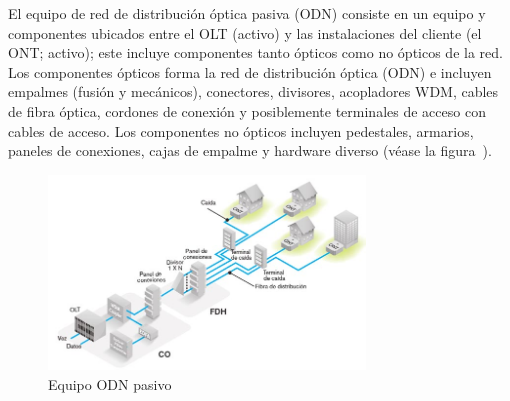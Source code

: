 El equipo de red de distribución óptica pasiva (ODN) consiste en un equipo y componentes ubicados entre el OLT (activo) y las instalaciones del cliente (el ONT; activo); este incluye componentes tanto ópticos como no ópticos de la red. Los componentes ópticos forma la red de distribución óptica (ODN) e incluyen empalmes (fusión y mecánicos), conectores, divisores, acopladores WDM, cables de fibra óptica, cordones de conexión y posiblemente terminales de acceso con cables de acceso. Los componentes no ópticos incluyen pedestales, armarios, paneles de conexiones, cajas de empalme y hardware diverso (véase la figura~).


\begin{figure}[H]
	\centering
	\includegraphics[width=0.75\textwidth]{./img/punto3/Equipo-ODN-pasivo.jpg}
	\caption{Equipo ODN pasivo}
	\label{fig:ODN_passive}
\end{figure}